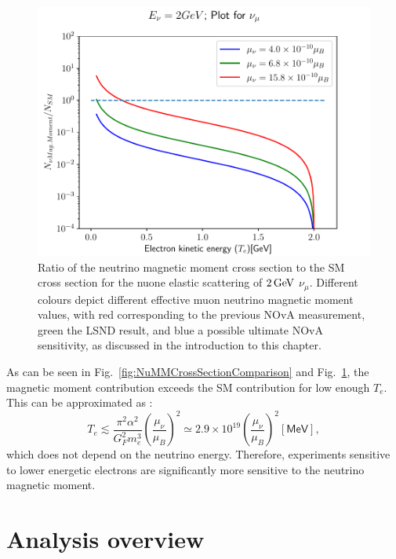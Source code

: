\begin{figure}[hbtp]
\centering
\includegraphics[width=.9\textwidth]{Plots/NuMM/RatioNumuMMCompLinX.pdf}
\caption[Ratio of the neutrino magnetic moment and the Standard Model cross sections]{Ratio of the neutrino magnetic moment cross section to the \acrshort{SM} cross section for the \acrshort{nuone} elastic scattering of $\unit[2]{GeV}$ $\nu_\mu$. Different colours depict different effective muon neutrino magnetic moment values, with red corresponding to the previous \acrshort{NOvA} measurement, green the LSND result, and blue a possible ultimate \acrshort{NOvA} sensitivity, as discussed in the introduction to this chapter.}
\label{fig:NuMMCrossSectionRatios}
\end{figure}

As can be seen in Fig.~\ref{fig:NuMMCrossSectionComparison} and Fig.~\ref{fig:NuMMCrossSectionRatios}, the magnetic moment contribution exceeds the \gls{SM} contribution for low enough $T_e$. This can be approximated as \cite{nuElmagInt2015.pdf}:
\begin{equation}
T_e\lesssim\frac{\pi^2\alpha^2}{G_F^2m_e^3}\left(\frac{\mu_{\nu}}{\mu_B}\right)^2\simeq 2.9\times 10^{19}\left(\frac{\mu_{\nu}}{\mu_B}\right)^2\left[\textsf{MeV}\right],
\end{equation}
which does not depend on the neutrino energy. Therefore, experiments sensitive to lower energetic electrons are significantly more sensitive to the neutrino magnetic moment.
\fi
\section{Analysis overview}\label{sec:NuMMAnalysisOverview}

